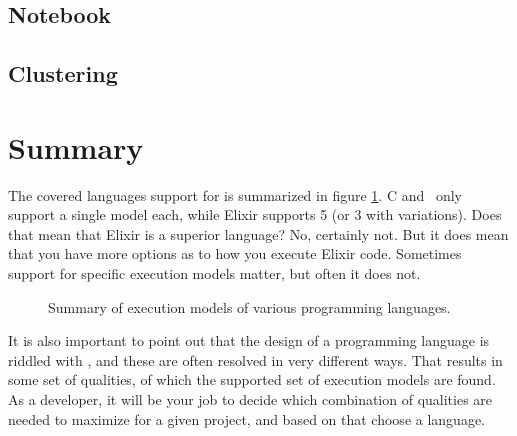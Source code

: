 
\subsection{Notebook}


\subsection{Clustering}


\section{Summary}

The covered languages support for  is summarized in figure \ref{fig:first:phases:summary}. C and \csharp\ only support a single model each, while Elixir supports 5 (or 3 with variations). Does that mean that Elixir is a superior language? No, certainly not. But it does mean that you have more options as to how you execute Elixir code. Sometimes support for specific execution models matter, but often it does not.

\begin{figure}[tbp]
  
  \caption{Summary of execution models of various programming languages.}
  \label{fig:first:phases:summary}
\end{figure}

It is also important to point out that the design of a programming language is riddled with , and these are often resolved in very different ways. That results in some set of qualities, of which the supported set of execution models are found. As a developer, it will be your job to decide which combination of qualities are needed to maximize  for a given project, and based on that choose a language.

